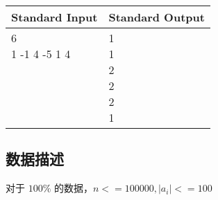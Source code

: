 \begin{table}[H]
\begin{tabularx}{\textwidth}{|X|X|}
    \hline
    \textbf{Standard Input} & \textbf{Standard Output} \\ 
    \hline 
    \tablecell{
        6 \\
        1 -1 4 -5 1 4 \\ \\ \\ \\ \\
    } & 
    \tablecell{
    1 \\
    1 \\
    2 \\
    2 \\
    2 \\
    1 \\

    } \\
    \hline
\end{tabularx}
\end{table}
\subsection*{数据描述}
对于 $100\%$ 的数据，$n <= 100000 , |a_i| <= 100$